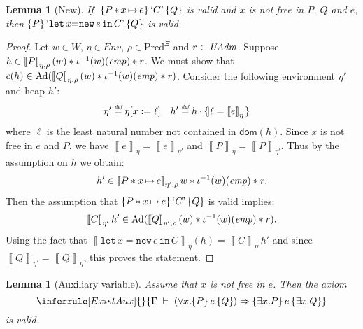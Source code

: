 \documentclass{LMCS}
\newtheorem{lemma}[theorem]{Lemma}
\theoremstyle{remark}
\newcommand{\QUOTE}[1]{\textnormal{`\ensuremath{#1}'}}
\newcommand{\SYN}[1]{\ensuremath{\texttt{#1}}}
\renewcommand{\l}{\ensuremath{\ell}\xspace}
\newcommand{\defeq}{\ensuremath{\stackrel{\mbox{\tiny \it def}}{=}}}
\newcommand{\record}[1]{\ensuremath{\left.\!\{\!|{#1}|\!\}\right.\!}}
\newcommand{\dom}[1]{\ensuremath{\mathsf{dom}({#1})}}
\newcommand{\COMB}{\ensuremath{\cdot}}
\newcommand{\Env}{\ensuremath{\textit{Env}}\xspace}
\newcommand{\triple}[3]{{\ensuremath{\!\left.\{ #1 \}\, #2\, \{  #3 \}\!\right.}}}
\newcommand{\wemp}{\textnormal{\textit{emp}}}
\newcommand{\den}[1]{\left\llbracket #1
  \right\rrbracket}
\newcommand{\Pred}{\ensuremath{\mathrm{Pred}}\xspace}
\newcommand{\W}{\ensuremath{W}}
\newcommand{\UNFOLD}{\ensuremath{\iota^{-1}}}
\newcommand{\X}{\ensuremath{\Xi}}
\begin{document}
\begin{lemma}[New] 
If\ $\,\triple{P\,{*}\,x\,{\mapsto}\,e}{\QUOTE{C}}{Q}$ is valid and $x$ is not free in $P$, $Q$ and $e$, then 
$\triple{P}{\QUOTE{\SYN{let}\,{x {=} \SYN{new}\,e}\,\SYN{in}\,{C}}}{Q}$ is valid. 
\end{lemma}

\begin{proof}
Let $w\in\W$, $\eta\in\Env$, $\rho\in\Pred^\X$ and $r\in\mathit{UAdm}$. Suppose $h\in\den{P}_{\eta,\rho}(w) * \UNFOLD(w)(\wemp) * r$.  
We must show that $c(h)\in\DCl(\den{Q}_{\eta,\rho}(w) * \UNFOLD(w)(\wemp) * r)$. 
Consider the following environment $\eta'$ and heap $h'$:
\begin{align*}
\eta' &\defeq \eta[x:=\l]
&
h' &\defeq h\COMB\record{\l = \den{e}_\eta}
\end{align*}
where $\l$ is the least natural number not contained in $\dom h$. 
Since $x$ is not free in $e$ and $P$, we have $\den{e}_\eta = \den{e}_{\eta'}$ and $\den{P}_\eta = \den{P}_{\eta'}$. Thus by the assumption on $h$ we obtain:
\begin{align*}
h'\in\den{P *x\,{\mapsto}\,e}_{\eta',\rho}w * \UNFOLD(w)(\wemp) * r .
\end{align*}
Then the 
assumption that $\triple{P*x\,{\mapsto}\,e}{\QUOTE{C}}{Q}$ is valid implies:
\begin{align*}
\den{C}_{\eta'}h'\in\DCl(\den{Q}_{\eta',\rho}(w) * \UNFOLD(w)(\wemp) * r) .
\end{align*}
Using the fact that 
$\den{\SYN{let}\,{x {=} \SYN{new}\,e}\,\SYN{in}\,{C}}_\eta(h) = \den{C}_{\eta'}h'$ and 
since $\den{Q}_{\eta'} = \den{Q}_\eta$, this proves the statement. 
\end{proof}


\begin{lemma}[Auxiliary variable]
Assume that $x$ is not free in $e$. Then the  axiom 
\[
\inferrule[ExistAux]{
}{
  \Gamma \;\adash\; (\forall x.\triple{P}{e}{Q})\Rightarrow\triple{\exists x.P}{e}{\exists x.Q}
}
\]
is valid. 
\end{lemma}
\end{document}
